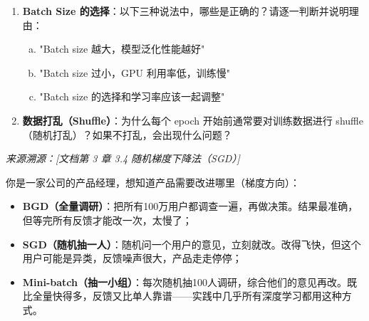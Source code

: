 \documentclass[a4paper,11pt]{ctexart}
\begin{document}
\begin{problembox}
\begin{enumerate}[(1)]
        \item \textbf{Batch Size 的选择}：以下三种说法中，哪些是正确的？请逐一判断并说明理由：
        \begin{enumerate}[a.]
            \item "Batch size 越大，模型泛化性能越好"
            \item "Batch size 过小，GPU 利用率低，训练慢"
            \item "Batch size 的选择和学习率应该一起调整"
        \end{enumerate}

        \item \textbf{数据打乱（Shuffle）}：为什么每个 epoch 开始前通常要对训练数据进行 shuffle（随机打乱）？如果不打乱，会出现什么问题？
    \end{enumerate}

    \vspace{0.2cm}
    {\color{gray}\small\textit{来源溯源：[文档第 3 章 3.4 随机梯度下降法（SGD）]}}
\end{problembox}

\begin{metaphorbox}
    你是一家公司的产品经理，想知道产品需要改进哪里（梯度方向）：

    \begin{itemize}
        \item \textbf{BGD（全量调研）}：把所有100万用户都调查一遍，再做决策。结果最准确，但等完所有反馈才能改一次，太慢了；
        \item \textbf{SGD（随机抽一人）}：随机问一个用户的意见，立刻就改。改得飞快，但这个用户可能是异类，反馈噪声很大，产品走走停停；
        \item \textbf{Mini-batch（抽一小组）}：每次随机抽100人调研，综合他们的意见再改。既比全量快得多，反馈又比单人靠谱——实践中几乎所有深度学习都用这种方式。
    \end{itemize}
\end{metaphorbox}
\end{document}
